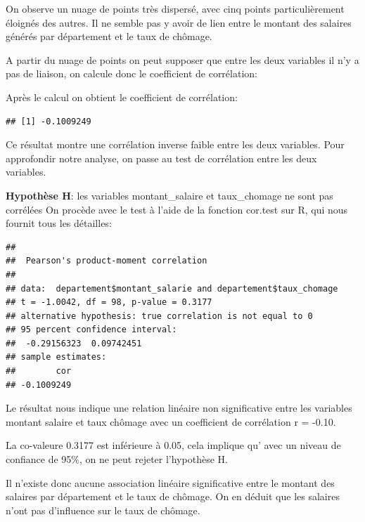 \documentclass[mstat,12pt]{unswthesis}
\begin{document}
On observe un nuage de points très dispersé, avec cinq points
particulièrement éloignés des autres. Il ne semble pas y avoir de lien
entre le montant des salaires générés par département et le taux de
chômage. \medskip 

A partir du nuage de points on peut supposer que entre les deux
variables il n'y a pas de liaison, on calcule donc le coefficient de
corrélation: \medskip 

Après le calcul on obtient le coefficient de corrélation:

\medskip

\begin{verbatim}
## [1] -0.1009249
\end{verbatim}

\medskip

Ce résultat montre une corrélation inverse faible entre les deux
variables. Pour approfondir notre analyse, on passe au test de
corrélation entre les deux variables.

\medskip

\textbf{Hypothèse H}: les variables montant\_salaire et taux\_chomage ne
sont pas corrélées On procède avec le test à l'aide de la fonction
cor.test sur R, qui nous fournit tous les détailles:

\medskip

\begin{verbatim}
## 
##  Pearson's product-moment correlation
## 
## data:  departement$montant_salarie and departement$taux_chomage
## t = -1.0042, df = 98, p-value = 0.3177
## alternative hypothesis: true correlation is not equal to 0
## 95 percent confidence interval:
##  -0.29156323  0.09742451
## sample estimates:
##        cor 
## -0.1009249
\end{verbatim}

\medskip

Le résultat nous indique une relation linéaire non significative entre
les variables montant salaire et taux chômage avec un coefficient de
corrélation r = -0.10.

\medskip

La co-valeure 0.3177 est inférieure à 0.05, cela implique qu' avec un
niveau de confiance de 95\%, on ne peut rejeter l'hypothèse H.

\medskip

Il n'existe donc aucune association linéaire significative entre le
montant des salaires par département et le taux de chômage. On en déduit
que les salaires n'ont pas d'influence sur le taux de chômage.
\end{document}
